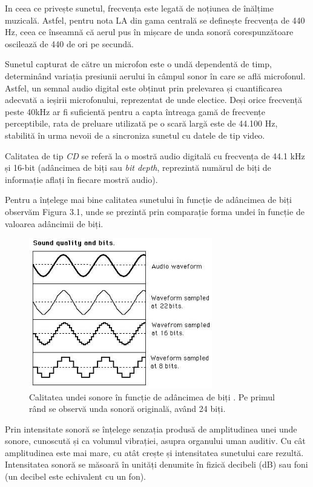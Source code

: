 \documentclass[a4paper,12pt]{report}
\begin{document}
In ceea ce privește sunetul, frecvența este legată de noțiunea de înălțime muzicală.
Astfel, pentru nota LA din gama centrală se definește frecvența de 440 Hz, ceea ce 
înseamnă că aerul pus în mișcare de unda sonoră corespunzătoare oscilează de 440 de 
ori pe secundă.

Sunetul capturat de către un microfon este o undă dependentă de timp, determinând 
variația presiunii aerului în câmpul sonor în care se află microfonul. Astfel, 
un semnal audio digital este obținut prin prelevarea și cuantificarea adecvată 
a ieșirii microfonului, reprezentat de unde electice. Deși orice frecvență 
peste 40kHz ar fi suficientă pentru a capta întreaga gamă de frecvențe perceptibile, 
rata de preluare utilizată pe o scară largă este de 44.100 Hz, stabilită în urma 
nevoii de a sincroniza sunetul cu datele de tip video.

Calitatea de tip \emph{CD} se referă la o mostră audio digitală cu frecvența de 44.1 kHz 
și 16-bit (adâncimea de biți sau \emph{bit depth}, reprezintă numărul de biți de informație 
aflați în fiecare mostră audio).

Pentru a înțelege mai bine calitatea sunetului în funcție de adâncimea de biți 
observăm Figura 3.1, unde se prezintă prin comparație forma undei în funcție de valoarea
adâncimii de biți.
\begin{figure}[h!]
    \centering
    \includegraphics[width=8cm]{..//resources//images//bits_ex.jpg}
    \caption{Calitatea undei sonore în funcție de adâncimea de biți \cite{WEBSITE:victorimpmooc}. 
    Pe primul rând se observă unda sonoră originală, având 24 biți.}
    \label{fig:bits}
\end{figure}

Prin intensitate sonoră se înțelege senzația produsă de amplitudinea unei unde 
sonore, cunoscută și ca volumul vibrației, asupra organului uman auditiv. Cu cât amplitudinea este 
mai mare, cu atât crește și intensitatea sunetului care rezultă. Intensitatea sonoră 
se măsoară în unități denumite în fizică decibeli (dB) sau foni (un decibel este 
echivalent cu un fon).
\end{document}
